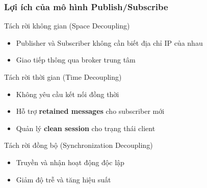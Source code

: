 \begin{frame}
\frametitle{Lợi ích của mô hình Publish/Subscribe}

\begin{block}{Tách rời không gian (Space Decoupling)}
\begin{itemize}
\item Publisher và Subscriber không cần biết địa chỉ IP của nhau
\item Giao tiếp thông qua broker trung tâm
\end{itemize}
\end{block}

\begin{block}{Tách rời thời gian (Time Decoupling)}
\begin{itemize}
\item Không yêu cầu kết nối đồng thời
\item Hỗ trợ \textbf{retained messages} cho subscriber mới
\item Quản lý \textbf{clean session} cho trạng thái client
\end{itemize}
\end{block}

\begin{block}{Tách rời đồng bộ (Synchronization Decoupling)}
\begin{itemize}
\item Truyền và nhận hoạt động độc lập
\item Giảm độ trễ và tăng hiệu suất
\end{itemize}
\end{block}

\end{frame}



